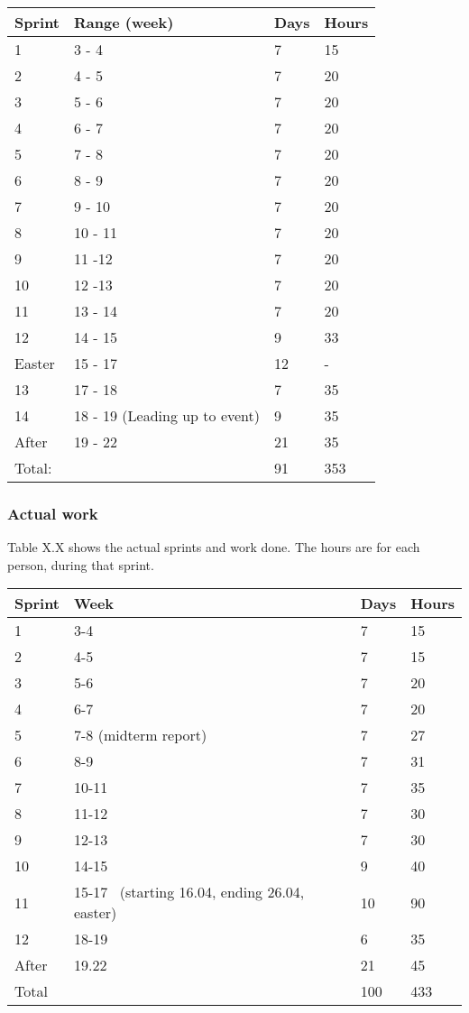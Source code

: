 \begin{tabular}{|l|l|l|l|}
\hline
 Sprint & Range (week) & Days &
 Hours\\\hline
 1 & 3 - 4 & 7 & 15\\\hline
 2 & 4 - 5 & 7 & 20\\\hline
 3 & 5 - 6 & 7 & 20 \\\hline
 4 & 6 - 7 & 7 & 20 \\\hline
 5 & 7 - 8 & 7 & 20\\\hline
 6 & 8 - 9  & 7 & 20\\\hline
 7 & 9 - 10 & 7 & 20\\\hline
 8 & 10 - 11 & 7 & 20\\\hline
 9 & 11 -12 & 7 & 20\\\hline
 10 & 12 -13 & 7 & 20\\\hline
 11 & 13 - 14 & 7 & 20\\\hline
 12  & 14 - 15  & 9 & 33\\\hline
 Easter & 15 - 17 & 12 & {}-\\\hline
 13 & 17 - 18 & 7 & 35\\\hline
 14 & 18 - 19 (Leading up to event) & 9 & 35\\\hline
 After & 19 - 22 & 21 & 35\\\hline
 Total:  & & 91 & 353\\\hline
\end{tabular}


\subsubsection{Actual work}
Table X.X shows the actual sprints and work done. The hours are for each
person, during that sprint.
\begin{tabular}{|l|l|l|l|}
\hline
 Sprint & Week & Days & Hours \\\hline
 1 & 3-4 & 7 & 15\\\hline
 2 & 4-5  & 7  & 15\\\hline
 3 & 5-6 & 7  & 20\\\hline
 4 & 6-7 & 7 & 20\\\hline
 5 & 7-8 (midterm report) & 7 & 27\\\hline
 6 & 8-9  & 7  & 31\\\hline
 7 & 10-11 & 7  & 35\\\hline
 8 & 11-12 & 7 & 30\\\hline
 9 & 12-13 & 7  & 30\\\hline
 10 & 14-15 & 9 & 40\\\hline
 11 & 15-17 \ (starting 16.04, ending 26.04, easter) & 10 & 90\\\hline
 12 & 18-19 & 6 & 35\\\hline
 After & 19.22 & 21 & 45\\\hline
 Total & & 100 & 433\\\hline
\end{tabular}


